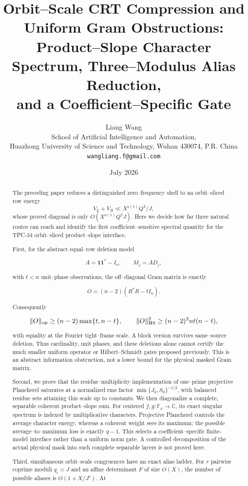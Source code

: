 \documentclass[11pt]{article}
\title{\textbf{Orbit--Scale CRT Compression and Uniform Gram Obstructions:}\\
\textbf{Product--Slope Character Spectrum, Three--Modulus Alias Reduction,}\\
\textbf{and a Coefficient--Specific Gate}}
\author{Liang Wang\\
\small School of Artificial Intelligence and Automation,\\[-0.2em]
\small Huazhong University of Science and Technology, Wuhan 430074, P.R. China\\
\small \texttt{wangliang.f@gmail.com}}
\date{July 2026}
\theoremstyle{definition}
\theoremstyle{remark}
\begin{document}
\maketitle

\begin{abstract}
The preceding paper reduces a distinguished zero--frequency shell to an
orbit--sliced row energy
\[
 V_L+V_R\ll X^{o(1)}Q^3/J,
\]
whose proved diagonal is only \(O(X^{o(1)}Q^2J)\).  Here we decide how
far three natural routes can reach and identify the first
coefficient--sensitive spectral quantity for the TPC-34 orbit--sliced
product--slope interface.

First, for the abstract equal--row deletion model

\[
 A=\mathbf1\mathbf1^*-I_n,\qquad M_j=AD_j,
\]

with \(t<n\) unit--phase observations, the off--diagonal Gram matrix is
exactly

\[
 O=(n-2)(R^*R-tI_n).
\]

Consequently

\[
 \|O\|_{\rm op}\ge(n-2)\max\{t,n-t\},\qquad
 \|O\|_{\rm HS}^2\ge(n-2)^2nt(n-t),
\]

with equality at the Fourier tight--frame scale.  A block version survives
same--source deletion.  Thus cardinality, unit phases, and these deletions
alone cannot certify the much smaller uniform operator or
Hilbert--Schmidt gates proposed previously.  This is an abstract
information obstruction, not a lower bound for the physical masked Gram
matrix.

Second, we prove that the residue--multiplicity implementation of one--prime
projective Plancherel saturates at a normalized rms factor
\(\min\{J_0,S_0\}^{-1/2}\), with balanced residue sets attaining this scale
up to constants.  We then diagonalize a complete, separable coherent
product--slope sum.  For centered
\(f,g:\mathbb F_q\to\mathbb C\), its exact singular spectrum is indexed by
multiplicative characters.  Projective Plancherel controls the average
character energy, whereas a coherent weight sees its maximum; the possible
average--to--maximum loss is exactly \(q-1\).  This selects a
coefficient--specific finite-model interface rather than a uniform norm
gate.  A controlled decomposition of the actual physical mask into such
complete separable layers is not proved here.

Third, simultaneous orbit--scale congruences have an exact alias ladder.
For \(r\) pairwise coprime moduli \(q_i\asymp J\) and an affine determinant
\(F\) of size \(O(X)\), the number of possible aliases is
\(O(1+X/J^r)\).  At


\end{abstract}
\end{document}
